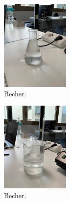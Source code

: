 \begin{figure}[H]
	\centering
	\includegraphics[width=0.30\textwidth]{4.jpg}
	\caption{Becher.}
\end{figure}

\begin{figure}[H]
	\centering
	\includegraphics[width=0.30\textwidth]{5.jpg}
	\caption{Becher.}
\end{figure}